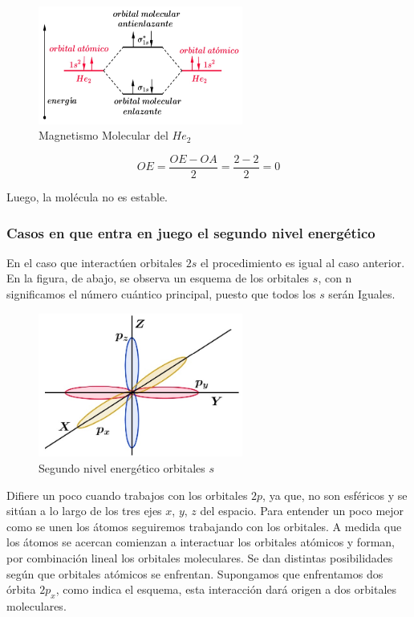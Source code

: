 \begin{itemize}
\begin{figure}[H]
    \centering
    \includegraphics[width=0.6\textwidth]{./Figures/MagMolecularHe2}
	\caption{Magnetismo Molecular del $He_{2}$}
	\label{fig:MagMolecular}
\end{figure}

\begin{equation}
	OE=\frac{OE-OA}{2}=\frac{2-2}{2}=0
\end{equation}

Luego, la molécula no es estable.
\end{itemize}


\subsubsection{Casos en que entra en juego el segundo nivel energético}

En el caso que interactúen orbitales $2s$ el procedimiento es igual al caso anterior. En la figura, de abajo, se observa un esquema de los orbitales $s$, con n significamos el número cuántico principal, puesto que todos los $s$ serán Iguales.

\begin{figure}[H]
    \centering
    \includegraphics[width=0.6\textwidth]{./Figures/SegundoNivelEnergetico}
	\caption{Segundo nivel energético orbitales $s$}
	\label{fig:SegundoNivelEnergetico}
\end{figure}

Difiere un poco cuando trabajos con los orbitales $2p$, ya que, no son esféricos y se sitúan a lo largo de los tres ejes $x$, $y$, $z$ del espacio. Para entender un poco mejor como se unen los átomos seguiremos trabajando con los orbitales. A medida que los átomos se acercan comienzan a interactuar los orbitales atómicos y forman, por combinación lineal los orbitales moleculares. Se dan distintas posibilidades según que orbitales atómicos se enfrentan. Supongamos que enfrentamos dos órbita $2p_{x}$, como indica el esquema, esta interacción dará origen a dos orbitales moleculares.

